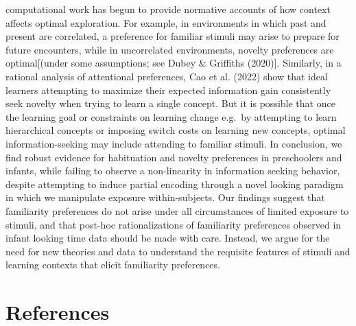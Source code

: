 \documentclass[10pt, letterpaper]{article}
\begin{document}
computational work has begun to provide normative accounts of how
context affects optimal exploration. For example, in environments in
which past and present are correlated, a preference for familiar stimuli
may arise to prepare for future encounters, while in uncorrelated
environments, novelty preferences are optimal{[}(under some assumptions;
see Dubey \& Griffiths (2020){]}. Similarly, in a rational analysis of
attentional preferences, Cao et al. (2022) show that ideal learners
attempting to maximize their expected information gain consistently seek
novelty when trying to learn a single concept. But it is possible that
once the learning goal or constraints on learning change e.g.~by
attempting to learn hierarchical concepts or imposing switch costs on
learning new concepts, optimal information-seeking may include attending
to familiar stimuli. In conclusion, we find robust evidence for
habituation and novelty preferences in preschoolers and infants, while
failing to observe a non-linearity in information seeking behavior,
despite attempting to induce partial encoding through a novel looking
paradigm in which we manipulate exposure within-subjects. Our findings
suggest that familiarity preferences do not arise under all
circumstances of limited exposure to stimuli, and that post-hoc
rationalizations of familiarity preferences observed in infant looking
time data should be made with care. Instead, we argue for the need for
new theories and data to understand the requisite features of stimuli
and learning contexts that elicit familiarity preferences.

\hypertarget{references}{%
\section{References}\label{references}}

\setlength{\parindent}{-0.1in} 
\setlength{\leftskip}{0.125in}

\noindent
\end{document}
